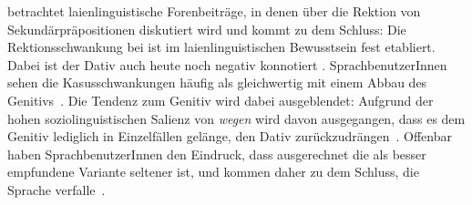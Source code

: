 \citet[]{Szczepaniak2014} betrachtet laienlinguistische Forenbeiträge, in denen über die Rektion von Sekundärpräpositionen diskutiert wird und kommt zu dem Schluss:
\glqq Die Rektionsschwankung bei \wegen{} ist im laienlinguistischen Bewusstsein fest etabliert. Dabei ist der Dativ auch heute noch negativ konnotiert\grqq{} \citep[45]{Szczepaniak2014}.  
SprachbenutzerInnen sehen die Kasusschwankungen h{\"a}ufig als gleichwertig mit einem Abbau des Genitivs~\citep[s.][45]{Szczepaniak2014}. 
Die Tendenz zum Genitiv wird dabei ausgeblendet: Aufgrund der hohen soziolinguistischen Salienz von \textit{wegen }wird davon ausgegangen, dass es dem Genitiv lediglich in Einzelf{\"a}llen gel{\"a}nge, den Dativ zur{\"u}ckzudr{\"a}ngen~\citep[s.][45, 46]{Szczepaniak2014}.
Offenbar haben SprachbenutzerInnen den Eindruck, dass ausgerechnet die als besser empfundene Variante seltener ist, und kommen daher zu dem Schluss, die Sprache verfalle~\citep[s.][36]{Szczepaniak2014}. 

